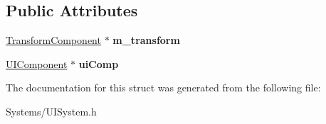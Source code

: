 \subsection*{Public Attributes}
\begin{DoxyCompactItemize}
\item 
\mbox{\label{structUICompNode_a7786231da60b7e2aa756c21213341174}} 
\hyperlink{classTransformComponent}{Transform\+Component} $\ast$ {\bfseries m\+\_\+transform}
\item 
\mbox{\label{structUICompNode_ac13913b5416ca2b4f993043f2886bb18}} 
\hyperlink{classUIComponent}{U\+I\+Component} $\ast$ {\bfseries ui\+Comp}
\end{DoxyCompactItemize}


The documentation for this struct was generated from the following file\+:\begin{DoxyCompactItemize}
\item 
Systems/U\+I\+System.\+h\end{DoxyCompactItemize}
